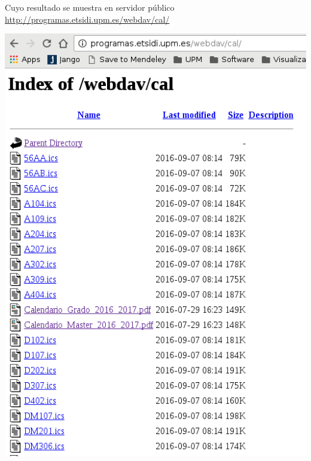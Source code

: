 \documentclass[spanish, xcolor={usenames,svgnames,dvipsnames}]{beamer}
\begin{document}
\begin{frame}[label={sec:orgf6abead}]{Cuyo resultado se muestra en servidor público}
\url{http://programas.etsidi.upm.es/webdav/cal/}

\begin{center}
\includegraphics[width=.9\linewidth]{images/webdav_cal.png}
\end{center}
\end{frame}
\end{document}
